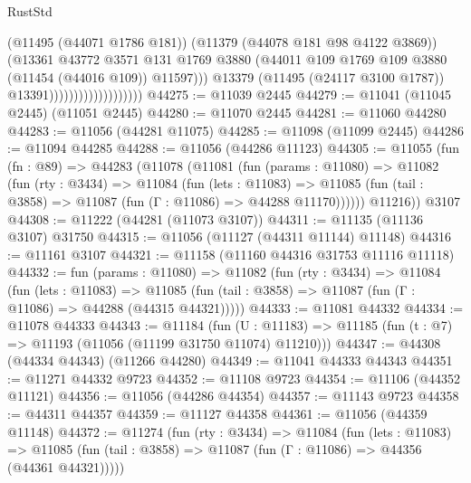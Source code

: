 \begin{lexlean}{RustStd}
\begin{coremodule}
                                            (@11495 (@44071 @1786 @181))
                                            (@11379 (@44078 @181 @98 @4122 @3869))
                                            (@13361
                                              @43772
                                              @3571
                                              @131
                                              @1769
                                              @3880
                                              (@44011
                                                @109
                                                @1769
                                                @109
                                                @3880
                                                (@11454 (@44016 @109))
                                                @11597)))
                                          @13379
                                          (@11495 (@24117 @3100 @1787))
                                          @13391)))))))))))))))))))
@44275 := @11039 @2445
@44279 := @11041 (@11045 @2445) (@11051 @2445)
@44280 := @11070 @2445
@44281 := @11060 @44280
@44283 := @11056 (@44281 @11075)
@44285 := @11098 (@11099 @2445)
@44286 := @11094 @44285
@44288 := @11056 (@44286 @11123)
@44305 := @11055
    (fun (fn : @89) =>
    @44283
      (@11078
        (@11081
          (fun (params : @11080) =>
          @11082
            (fun (rty : @3434) =>
            @11084
              (fun (lets : @11083) =>
              @11085 (fun (tail : @3858) => @11087 (fun (Γ : @11086) => @44288 @11170))))))
        @11216))
    @3107
@44308 := @11222 (@44281 (@11073 @3107))
@44311 := @11135 (@11136 @3107) @31750
@44315 := @11056 (@11127 (@44311 @11144) @11148)
@44316 := @11161 @3107
@44321 := @11158 (@11160 @44316 @31753 @11116 @11118)
@44332 := fun (params : @11080) =>
  @11082
    (fun (rty : @3434) =>
    @11084
      (fun (lets : @11083) =>
      @11085 (fun (tail : @3858) => @11087 (fun (Γ : @11086) => @44288 (@44315 @44321)))))
@44333 := @11081 @44332
@44334 := @11078 @44333
@44343 := @11184
    (fun (U : @11183) => @11185 (fun (t : @7) => @11193 (@11056 (@11199 @31750 @11074) @11210)))
@44347 := @44308 (@44334 @44343) (@11266 @44280)
@44349 := @11041 @44333 @44343
@44351 := @11271 @44332 @9723
@44352 := @11108 @9723
@44354 := @11106 (@44352 @11121)
@44356 := @11056 (@44286 @44354)
@44357 := @11143 @9723
@44358 := @44311 @44357
@44359 := @11127 @44358
@44361 := @11056 (@44359 @11148)
@44372 := @11274
    (fun (rty : @3434) =>
    @11084
      (fun (lets : @11083) =>
      @11085 (fun (tail : @3858) => @11087 (fun (Γ : @11086) => @44356 (@44361 @44321)))))

\end{coremodule}
\end{lexlean}
